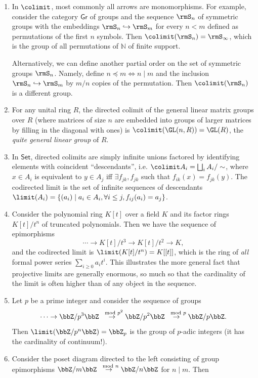 \begin{example}
\begin{enumerate}
    \item In $\colimit$, most commonly all arrows are monomorphisms. For example, consider the category $\mathsf{Gr}$ of groups and the sequence $\rmS_n$ of symmetric groups with the embeddings $\rmS_n\hookrightarrow \rmS_m$ for every $n<m$ defined as permutations of the first $n$ symbols. Then $\colimit(\rmS_n)=\rmS_\infty$, which is the group of all permutations of $\mathbb{N}$ of finite support.
    
    Alternatively, we can define another partial order on the set of symmetric groups $\rmS_n$. Namely, define $n\preccurlyeq m\Leftrightarrow n\mid m$ and the inclusion $\rmS_n\hookrightarrow \rmS_m$ by $m/n$ copies of the permutation. Then $\colimit (\rmS_n)$ is a different group.
    \item For any unital ring $R$, the directed colimit of the general linear matrix groups over $R$ (where matrices of size $n$ are embedded into groups of larger matrices by filling in the diagonal with ones) is $\colimit(\GL(n,R))=\GL(R)$, the \emph{quite general linear group} of $R$.
    \item In $\mathsf{Set}$, directed colimits are simply infinite unions factored by identifying elements with coincident ``descendants'', i.e. $\colimit A_i=\bigsqcup_i A_i/\sim$, where $x\in A_i$ is equivalent to $y\in A_j$ iff $\exists f_{jk},f_{jk}$ such that $f_{ik}(x)=f_{jk}(y)$. The codirected limit is the set of infinite sequences of descendants $\limit (A_i)=\{(a_i)\mid a_i\in A_i,\forall i\leq j, f_{ij}(a_i)=a_j\}$.
    \item Consider the polynomial ring $K[t]$ over a field $K$ and its factor rings $K[t]/t^n$ of truncated polynomials. Then we have the sequence of epimorphisms 
    \[\cdots \to K[t]/t^3\to K[t]/t^2\to K,\]
    and the codirected limit is $\limit(K[t]/t^n)=K[[t]]$, which is the ring of \emph{all} formal power series $\sum_{i\geq 0}a_i t^i$. This illustrates the more general fact that projective limits are generally enormous, so much so that the cardinality of the limit is often higher than of any object in the sequence.
    \item Let $p$ be a prime integer and consider the sequence of groups
    \[\cdots\to \bbZ/p^3 \bbZ\overset{\mod p^2}\to \bbZ/p^2\bbZ\overset{\mod p}\to \bbZ/p\bbZ.\]
    Then $\limit(\bbZ/p^n\bbZ)=\bbZ_p$ is the group of $p$-adic integers (it has the cardinality of continuum!).
    \item Consider the poset diagram directed to the left consisting of group epimorphisms $\bbZ/m\bbZ\overset{\mod n}\to \bbZ/n\bbZ$ for $n\mid m$. Then 

\end{enumerate}
\end{example}
